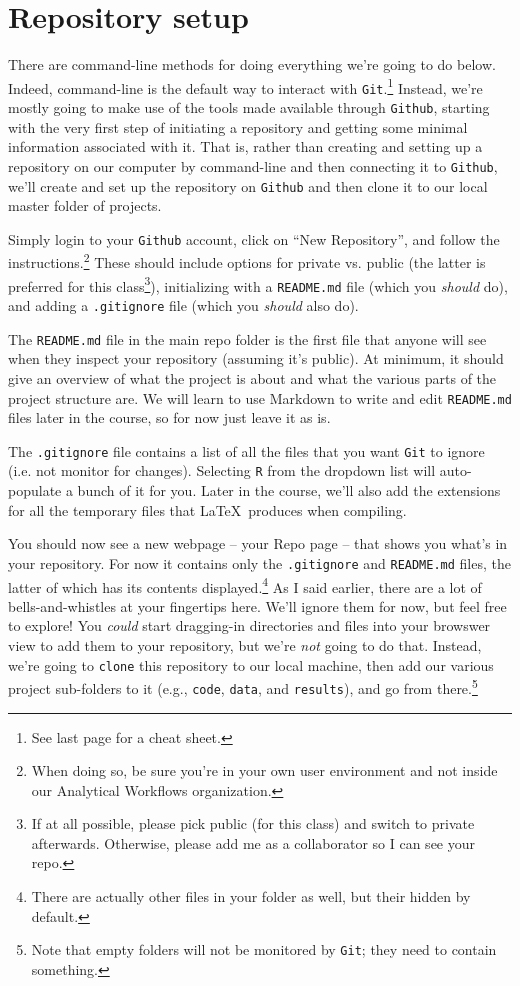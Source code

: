 \documentclass[12pt,letterpaper]{article}
\begin{document}
\section{Repository setup}
There are command-line methods for doing everything we're going to do below.
Indeed, command-line is the default way to interact with \texttt{Git}.\footnote{See last page for a cheat sheet.}
Instead, we're mostly going to make use of the tools made available through \texttt{Github}, starting with the very first step of initiating a repository and getting some minimal information associated with it.
That is, rather than creating and setting up a repository on our computer by command-line and then connecting it to \texttt{Github}, we'll create and set up the repository on \texttt{Github} and then clone it to our local master folder of projects.

Simply login to your \texttt{Github} account, click on ``New Repository'', and follow the instructions.\footnote{When doing so, be sure you're in your own user environment and not inside our Analytical Workflows organization.}
These should include options for private vs. public (the latter is preferred for this class\footnote{If at all possible, please pick public (for this class) and switch to private afterwards.  Otherwise, please add me as a collaborator so I can see your repo.}), initializing with a \texttt{README.md} file (which you \emph{should} do), and adding a \texttt{.gitignore} file (which you \emph{should} also do).

The \texttt{README.md} file in the main repo folder is the first file that anyone will see when they inspect your repository (assuming it's public).
At minimum, it should give an overview of what the project is about and what the various parts of the project structure are.
We will learn to use Markdown to write and edit \texttt{README.md} files later in the course, so for now just leave it as is.

The \texttt{.gitignore} file contains a list of all the files that you want \texttt{Git} to ignore (i.e. not monitor for changes).
Selecting \texttt{R} from the dropdown list will auto-populate a bunch of it for you.
Later in the course, we'll also add the extensions for all the temporary files that \LaTeX\ produces when compiling.

You should now see a new webpage -- your Repo page -- that shows you what's in your repository.
For now it contains only the \texttt{.gitignore} and \texttt{README.md} files, the latter of which has its contents displayed.\footnote{There are actually other files in your folder as well, but their hidden by default.}
As I said earlier, there are a lot of bells-and-whistles at your fingertips here.
We'll ignore them for now, but feel free to explore!
You \emph{could} start dragging-in directories and files into your browswer view to add them to your repository, but we're \emph{not} going to do that.
Instead, we're going to \texttt{clone} this repository to our local machine, then add our various project sub-folders to it (e.g., \texttt{code}, \texttt{data}, and \texttt{results}), and go from there.\footnote{Note that empty folders will not be monitored by \texttt{Git}; they need to contain something.}
\end{document}
